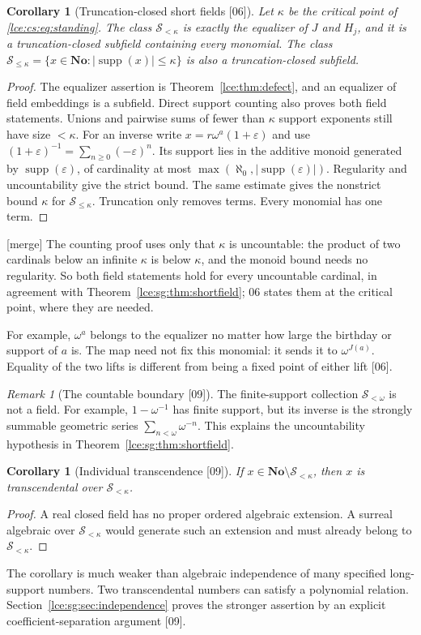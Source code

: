 \documentclass[11pt,letterpaper]{article}
\numberwithin{equation}{section}
\newtheorem{corollary}[theorem]{Corollary}
\theoremstyle{definition}
\theoremstyle{remark}
\newtheorem{remark}[theorem]{Remark}
\newcommand{\No}{\mathbf{No}}
\newcommand{\supp}{\operatorname{supp}}
\newcommand{\Sk}{\mathscr S_{<\kappa}}
\newcommand{\eps}{\varepsilon}
\newcommand{\abs}[1]{\lvert#1\rvert}
\newcommand{\thref}[1]{Theorem~\ref{#1}}
\newcommand{\src}[1]{\textup{\textsf{\small[#1]}}}%
\newcommand{\mergetag}{\textup{\textsf{\small[merge]}}}%
\newcommand{\Skle}{\mathscr S_{\le\kappa}}
\begin{document}
\begin{corollary}[Truncation-closed short fields \src{06}]\label{lce:cs:cor:shortfields}
Let $\kappa$ be the critical point of \eqref{lce:cs:eq:standing}. The class
$\Sk$ is exactly the equalizer of $J$ and $H_j$, and it is a
truncation-closed subfield containing every monomial. The class
$\Skle=\{x\in\No:\abs{\supp(x)}\le\kappa\}$ is also a truncation-closed
subfield.
\end{corollary}
\begin{proof}
The equalizer assertion is \thref{lce:thm:defect}, and an equalizer of field
embeddings is a subfield. Direct support counting also proves both field
statements. Unions and pairwise sums of fewer than $\kappa$ support
exponents still have size $<\kappa$. For an inverse write
$x=r\omega^a(1+\eps)$ and use $(1+\eps)^{-1}=\sum_{n\ge0}(-\eps)^n$. Its
support lies in the additive monoid generated by $\supp(\eps)$, of
cardinality at most $\max(\aleph_0,\abs{\supp(\eps)})$. Regularity and
uncountability give the strict bound. The same estimate gives the nonstrict
bound $\kappa$ for $\Skle$. Truncation only removes terms. Every monomial has
one term.
\end{proof}
\mergetag{} The counting proof uses only that $\kappa$ is uncountable: the
product of two cardinals below an infinite $\kappa$ is below $\kappa$, and
the monoid bound needs no regularity. So both field statements hold for
every uncountable cardinal, in agreement with \thref{lce:sg:thm:shortfield};
06 states them at the critical point, where they are needed.

For example, $\omega^a$ belongs to the equalizer no matter how large the
birthday or support of $a$ is. The map need not fix this monomial: it sends
it to $\omega^{J(a)}$. Equality of the two lifts is different from being a
fixed point of either lift \src{06}.

\begin{remark}[The countable boundary \src{09}]
The finite-support collection $\mathscr S_{<\omega}$ is not a field. For
example, $1-\omega^{-1}$ has finite support, but its inverse is the strongly
summable geometric series $\sum_{n<\omega}\omega^{-n}$. This explains the
uncountability hypothesis in \thref{lce:sg:thm:shortfield}.
\end{remark}

\begin{corollary}[Individual transcendence \src{09}]\label{lce:sg:cor:transcendence}
If $x\in\No\setminus\Sk$, then $x$ is transcendental over $\Sk$.
\end{corollary}
\begin{proof}
A real closed field has no proper ordered algebraic extension. A surreal
algebraic over $\Sk$ would generate such an extension and must already
belong to $\Sk$.
\end{proof}
The corollary is much weaker than algebraic independence of many specified
long-support numbers. Two transcendental numbers can satisfy a polynomial
relation. Section~\ref{lce:sg:sec:independence} proves the stronger
assertion by an explicit coefficient-separation argument \src{09}.
\end{document}
